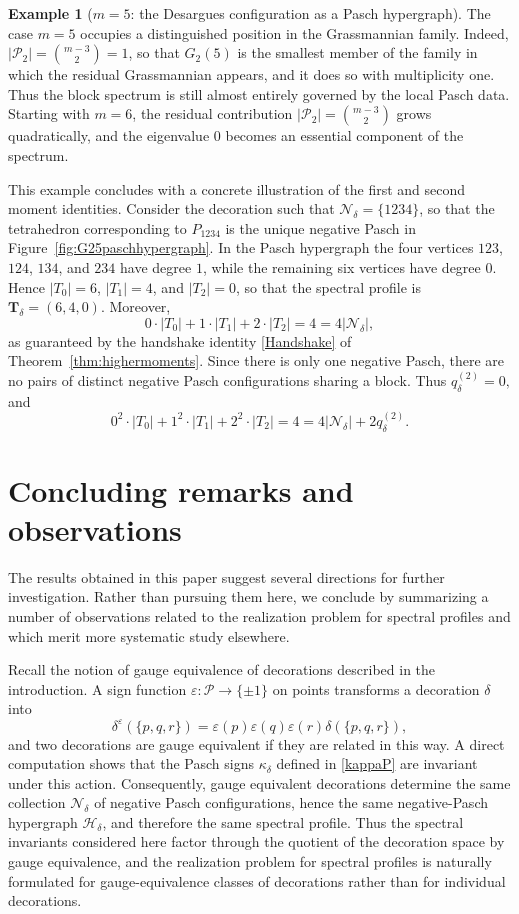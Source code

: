 \documentclass[times,11pt,reqno]{amsproc}
\theoremstyle{definition}
\newtheorem{example}[theorem]{Example}
\numberwithin{equation}{section}
\begin{document}
\begin{example}[$m = 5$: the Desargues configuration as a Pasch hypergraph]
The case $m=5$ occupies a distinguished position in the Grassmannian
family. Indeed,
$|\mathcal{P}_2| = \binom{m-3}{2} = 1$, so that $G_2(5)$ is the smallest member of the family in which the
residual Grassmannian appears, and it does so with multiplicity
one. Thus the block spectrum is still almost entirely governed by the
local Pasch data. Starting with $m=6$, the residual contribution
$|\mathcal{P}_2| = \binom{m-3}{2}$ grows quadratically, and the eigenvalue $0$ becomes an essential
component of the spectrum.


This example concludes with a concrete illustration of the first and second moment
identities. Consider the decoration such that $\mathcal N_\delta=\{1234\}$, so that the tetrahedron corresponding to $P_{1234}$ is the unique
negative Pasch in Figure~\ref{fig:G25paschhypergraph}. In the Pasch hypergraph the four vertices $123$, $124$, $134$, and $234$ have degree $1$, while the remaining six vertices have degree $0$.
Hence $|T_0|=6$, $|T_1|=4$, and $|T_2|=0$, so that the spectral profile is
$
\mathbf T_\delta=(6,4,0).
$
Moreover,
$$
0\cdot |T_0|
+
1\cdot |T_1|
+
2\cdot |T_2|
=
4
=
4|\mathcal N_\delta|,
$$
as guaranteed by the handshake identity \eqref{Handshake} of Theorem~\ref{thm:highermoments}. Since there is only one negative Pasch, there are no pairs of distinct
negative Pasch configurations sharing a block. Thus
$q_\delta^{(2)}=0,$ and
$$
0^2\cdot |T_0|
+
1^2\cdot |T_1|
+
2^2\cdot |T_2|
=
4
=
4|\mathcal N_\delta|+2q_\delta^{(2)}.
$$
\end{example}

\section{Concluding remarks and observations}\label{sec:concl}

The results obtained in this paper suggest several directions for
further investigation. Rather than pursuing them here, we conclude by
summarizing a number of observations related
to the realization problem for spectral profiles and which merit more
systematic study elsewhere.

Recall the notion of gauge equivalence of decorations described in
the introduction. A sign function
$\varepsilon:\mathcal P\to\{\pm1\}$ on points transforms a decoration
$\delta$ into
$$
\delta^\varepsilon(\{p,q,r\})
=
\varepsilon(p)\varepsilon(q)\varepsilon(r)\delta(\{p,q,r\}),
$$
and two decorations are gauge equivalent if they are related in this way. A
direct computation shows that the Pasch signs $\kappa_\delta$ defined in \eqref{kappaP} are
invariant under this action. Consequently, gauge equivalent decorations
determine the same collection $\mathcal N_\delta$ of negative Pasch
configurations, hence the same negative-Pasch hypergraph
$\mathscr H_\delta$, and therefore the same spectral profile. Thus the
spectral invariants considered here factor through the
quotient of the decoration space by gauge equivalence, and the
realization problem for spectral profiles is naturally formulated for
gauge-equivalence classes of decorations rather than for individual decorations.
\end{document}
